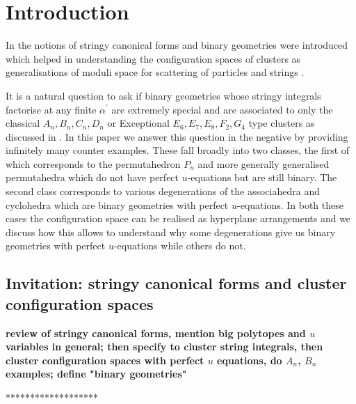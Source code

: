 \documentclass[hidelinks,12pt]{article}
\begin{document}
\vfill \eject



\baselineskip=18pt

\tableofcontents

\newpage
\section{Introduction}
In \cite{} the notions of stringy canonical forms and binary geometries were introduced which helped in understanding the configuration spaces of clusters as generalisations of moduli space for scattering of particles and strings . 

It is a natural question to ask if binary geometries whose stringy integrals factorise at any finite $\alpha^{'}$ are extremely special and are associated to only the classical $A_n, B_n, C_n,D_n$ or  Exceptional $E_6, E_7, E_8, F_2, G_4$  type clusters  as discussed in \cite{}. In this paper we answer this question in the negative by providing infinitely many counter examples. These fall broadly into two classes, the first of which corresponds to the permutahedron $P_n$ and more generally generalised permutahedra which do not have perfect $u$-equations but are still binary. The second class corresponds to various degenerations of the associahedra and cyclohedra which are binary geometries with perfect $u$-equations. In both these cases the configuration space can be realised as hyperplane arrangements and we discuss how this allows to understand why some degenerations give us binary geometries with perfect $u$-equations while others do not.

\subsection{Invitation: stringy canonical forms and cluster configuration spaces}

{\bf review of stringy canonical forms, mention big polytopes and $u$ variables in general; then specify to cluster string integrals, then cluster configuration spaces with perfect $u$ equations, do $A_n$, $B_n$ examples; define "binary geometries"}

*******************
\end{document}
